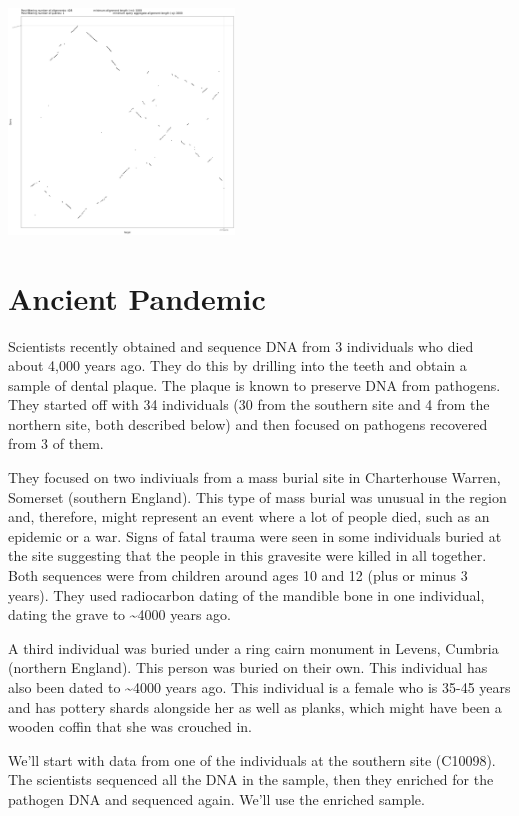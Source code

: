 \documentclass[
]{book}
\begin{document}
\includegraphics[width=0.45\textwidth,height=\textheight]{./Figures/YexYp.png}

\hypertarget{ancient-pandemic}{%
\chapter{Ancient Pandemic}\label{ancient-pandemic}}

Scientists recently obtained and sequence DNA from 3 individuals who died about 4,000 years ago. They do this by drilling into the teeth and obtain a sample of dental plaque. The plaque is known to preserve DNA from pathogens. They started off with 34 individuals (30 from the southern site and 4 from the northern site, both described below) and then focused on pathogens recovered from 3 of them.

They focused on two indiviuals from a mass burial site in Charterhouse Warren, Somerset (southern England). This type of mass burial was unusual in the region and, therefore, might represent an event where a lot of people died, such as an epidemic or a war. Signs of fatal trauma were seen in some individuals buried at the site suggesting that the people in this gravesite were killed in all together. Both sequences were from children around ages 10 and 12 (plus or minus 3 years). They used radiocarbon dating of the mandible bone in one individual, dating the grave to \textasciitilde4000 years ago.

A third individual was buried under a ring cairn monument in Levens, Cumbria (northern England). This person was buried on their own. This individual has also been dated to \textasciitilde4000 years ago. This individual is a female who is 35-45 years and has pottery shards alongside her as well as planks, which might have been a wooden coffin that she was crouched in.

We'll start with data from one of the individuals at the southern site (C10098). The scientists sequenced all the DNA in the sample, then they enriched for the pathogen DNA and sequenced again. We'll use the enriched sample.
\end{document}
